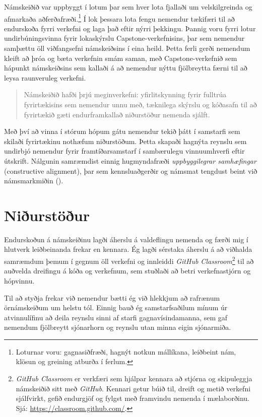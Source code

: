 \documentclass{kennsluakademia_conf}
\begin{document}
Námskeiðið var uppbyggt í lotum þar sem hver lota fjallaði um velskilgreinda og afmarkaða aðferðafræði.\footnote{Loturnar voru: gagnasiðfræði, hagnýt notkun mállíkana, leiðbeint nám, klösun og greining atburða í ferlum.} Í lok þessara lota fengu nemendur tækifæri til að endurskoða fyrri verkefni og laga það eftir nýrri þekkingu. Þannig voru fyrri lotur undirbúningsvinna fyrir lokaskýrslu Capstone-verkefnisins, þar sem nemendur samþættu öll viðfangsefni námskeiðsins í eina heild. Þetta ferli gerði nemendum kleift að þróa og bæta verkefnin smám saman, með Capstone-verkefnið sem hápunkt námskeiðsins sem kallaði á að nemendur nýttu fjölbreytta færni til að leysa raunveruleg verkefni. 

\begin{quote}
Námskeiðið hafði þrjú meginverkefni: yfirlitskynning fyrir fulltrúa fyrirtækisins sem nemendur unnu með, tæknilega skýrslu og kóðasafn til að fyrirtækið gæti endurframkallað niðurstöður nemenda sjálft.
\end{quote}

Með því að vinna í stórum hópum gátu nemendur tekið þátt í samstarfi sem skilaði fyrirtækinu nothæfum niðurstöðum. Þetta skapaði hagnýta reynslu sem undirbjó nemendur fyrir framtíðarsamstarf í sambærulegu vinnuumhverfi eftir útskrift. Nálgunin samræmdist einnig hugmyndafræði \textit{uppbyggilegrar samhæfingar} (constructive alignment), þar sem kennsluaðgerðir og námsmat tengdust beint við námsmarkmiðin (\cite{biggs_constructive}).


\section{Niðurstöður}

Endurskoðun á námskeiðinu lagði áherslu á valdeflingu nemenda og færði mig í hlutverk leiðbeinanda frekar en kennara. Ég lagði sérstaka áherslu á að viðhalda samræmdum þemum í gegnum öll verkefni og innleiddi \textit{GitHub Classroom}\footnote{\textit{GitHub Classroom} er verkfæri sem hjálpar kennara að stjórna og skipuleggja námskeiðið sitt með \textit{GitHub}. Kennari getur búið til, dreift og metið verkefni sjálfvirkt, gefið endurgjöf og fylgst með framvindu nemenda í mælaborðinu. Sjá: \url{https://classroom.github.com/}.} til að auðvelda dreifingu á kóða og verkefnum, sem stuðlaði að betri verkefnastjórn og hópvinnu.

Til að styðja frekar við nemendur bætti ég við hlekkjum að rafrænum örnámskeiðum um helstu tól. Einnig bauð ég samstarfsaðilum mínum úr atvinnulífinu að deila reynslu sinni af starfi gagnavísindamanna, sem gaf nemendum fjölbreytt sjónarhorn og reynslu utan minna eigin sjónarmiða.
\end{document}

